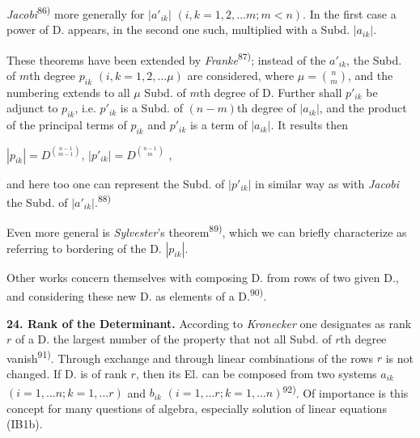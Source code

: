 \thispagestyle{fancy}

\vspace{0.5cm}

\textit{Jacobi}\textsuperscript{86)} more generally for $|a'_{ik}|$ $(i,k=1,2,...m; m<n)$. In the first case a power of D. appears, in the second one such, multiplied with a Subd. $|a_{ik}|$.

These theorems have been extended by \textit{Franke}\textsuperscript{87)}; instead of the $a'_{ik}$, the Subd. of $m$th degree $p_{ik}$ $(i,k=1,2,...\mu)$ are considered, where $\mu=\binom{n}{m}$, and the numbering extends to all $\mu$ Subd. of $m$th degree of D. Further shall $p'_{ik}$ be adjunct to $p_{ik}$, i.e. $p'_{ik}$ is a Subd. of $(n-m)$th degree of $|a_{ik}|$, and the product of the principal terms of $p_{ik}$ and $p'_{ik}$ is a term of $|a_{ik}|$. It results then 

\vspace{-0.1cm}
\begin{center}
    $|p_{ik}| = D^{\binom{n-1}{m-1}}$, \quad $|p'_{ik}| = D^{\binom{n-1}{m}}$ ,
\end{center}
\vspace{-0.1cm}

and here too one can represent the Subd. of $|p'_{ik}|$ in similar way as with \textit{Jacobi} the Subd. of $|a'_{ik}|$.\textsuperscript{88)}

Even more general is \textit{Sylvester}'s theorem\textsuperscript{89)}, which we can briefly characterize as referring to bordering of the D. $|p_{ik}|$.

Other works concern themselves with composing D. from rows of two given D., and considering these new D. as elements of a D.\textsuperscript{90)}.

\vspace{0.2cm}

\textbf{24. Rank of the Determinant.} According to \textit{Kronecker} one designates as rank $r$ of a D. the largest number of the property that not all Subd. of $r$th degree vanish\textsuperscript{91)}. Through exchange and through linear combinations of the rows $r$ is not changed. If D. is of rank $r$, then its El. can be composed from two systems $a_{ik}$ $(i=1,...n; k=1,...r)$ and $b_{ik}$ $(i=1,...r; k=1,...n)$\textsuperscript{92)}. Of importance is this concept for many questions of algebra, especially solution of linear equations (IB1b).

